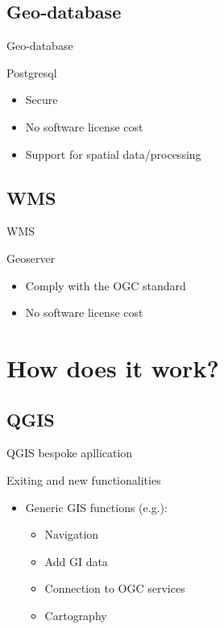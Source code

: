 \subsection{Geo-database}
\begin{frame}{Geo-database}
	\begin{block}{Postgresql}
		\begin{itemize}
			\item Secure
			\item No software license cost
			\item Support for spatial data/processing
		\end{itemize}
	\end{block}
\end{frame}

\subsection{WMS}
\begin{frame}{WMS}
	\begin{block}{Geoserver}
		\begin{itemize}
			\item Comply with the OGC standard
			\item No software license cost
		\end{itemize}
	\end{block}
\end{frame}

\section{How does it work?}


\subsection{QGIS}
\begin{frame}{QGIS bespoke apllication}
	\begin{block}{Exiting and new functionalities}
		\begin{itemize}
			\item Generic GIS functions (e.g.):
			\begin{itemize}
				\item Navigation
				\item Add GI data
				\item Connection to OGC services
				\item Cartography
			\end{itemize}
		\end{itemize}
	\end{block}
\end{frame}

